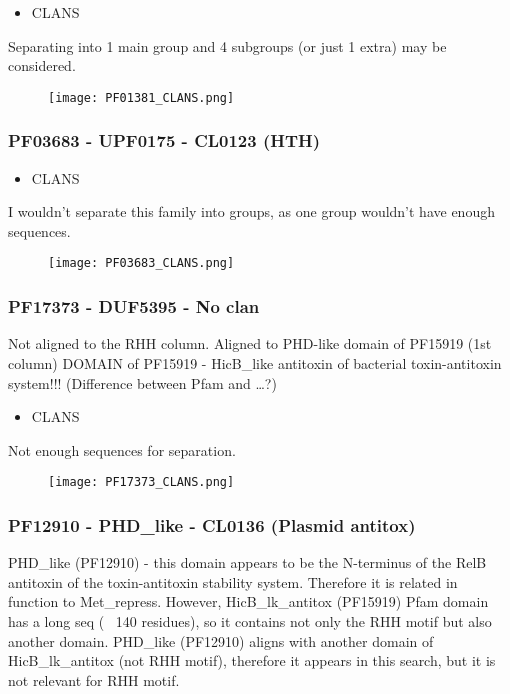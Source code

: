 \begin{itemize}
    \item CLANS
\end{itemize}
Separating into 1 main group and 4 subgroups (or just 1 extra) may be considered.

\begin{figure}[H]
\begin{center}
\texttt{[image: PF01381\_CLANS.png]}
\end{center}
\end{figure}

    \subsubsection{PF03683 - UPF0175 - CL0123 (HTH)}
\begin{itemize}
    \item CLANS
\end{itemize}
I wouldn't separate this family into groups, as one group wouldn't have enough sequences.
\begin{figure}[H]
\begin{center}
\texttt{[image: PF03683\_CLANS.png]}
\end{center}
\end{figure}

    \subsubsection{PF17373 - DUF5395 - No clan}
Not aligned to the RHH column.
Aligned to PHD-like domain of PF15919 (1st column)
DOMAIN of PF15919 - HicB\_like antitoxin of bacterial toxin-antitoxin system!!! (Difference between Pfam and \ldots?)

\begin{itemize}
    \item CLANS
\end{itemize}
Not enough sequences for separation.
\begin{figure}[H]
\begin{center}
\texttt{[image: PF17373\_CLANS.png]}
\end{center}
\end{figure}

    \subsubsection{PF12910 - PHD\_like - CL0136 (Plasmid antitox)}
PHD\_like (PF12910) - this domain appears to be the N-terminus of the RelB antitoxin of the toxin-antitoxin stability system.
Therefore it is related in function to Met\_repress.
However, HicB\_lk\_antitox (PF15919) Pfam domain has a long seq (~ 140 residues), so it contains not only the RHH motif but also another domain.
PHD\_like (PF12910) aligns with another domain of HicB\_lk\_antitox (not RHH motif), therefore it appears in this search, but it is not relevant for RHH motif.

